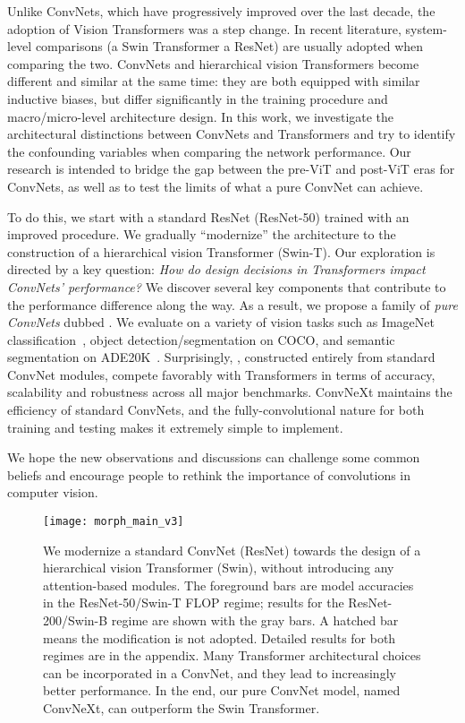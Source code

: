 Unlike ConvNets, which have progressively improved over the last decade, the adoption of Vision Transformers was a step change. In recent literature, system-level comparisons (\eg a Swin Transformer \vs a ResNet) are usually adopted when comparing the two. ConvNets and hierarchical vision Transformers become different and similar at the same time: they are both equipped with similar inductive biases, but differ significantly in the training procedure and macro/micro-level architecture design. 
In this work, 
we investigate the architectural distinctions between ConvNets and Transformers and try to identify the confounding variables when comparing the network performance.
Our research is intended to bridge the gap between the pre-ViT and post-ViT eras for ConvNets, as well as to test the limits of what a pure ConvNet can achieve. 

To do this, we start with a standard ResNet (\eg ResNet-50) trained with an improved procedure. We gradually ``modernize'' the architecture to the construction of a hierarchical vision Transformer (\eg Swin-T). Our exploration is directed by a key question: \emph{How do design decisions in Transformers impact ConvNets' performance?} We discover several key components that contribute to the performance difference along the way. As a result, we propose a family of \textit{pure ConvNets} dubbed \cnn{}. 
We evaluate  on a variety of vision tasks such as ImageNet classification~\cite{Deng2009}, object detection/segmentation on COCO\cite{Lin2014}, and semantic segmentation on ADE20K~\cite{Zhou2019}. Surprisingly, , constructed entirely from standard ConvNet modules, compete favorably with Transformers in terms of accuracy, scalability and robustness across all major benchmarks. 
ConvNeXt maintains the efficiency of standard ConvNets, and the fully-convolutional nature for both training and testing makes it extremely simple to implement.

We hope the new observations and discussions can challenge some common beliefs and encourage people to rethink the importance of convolutions in computer vision.

\begin{figure}[!htbp] 
\centering
\texttt{[image: morph\_main\_v3]}
\caption{We modernize a standard ConvNet (ResNet) towards the design of a hierarchical vision Transformer (Swin), without introducing any attention-based modules. The foreground bars are model accuracies in the ResNet-50/Swin-T FLOP regime; results for the ResNet-200/Swin-B regime are shown with the gray bars. A hatched bar means the modification is not adopted. Detailed results for both regimes are in the appendix. Many Transformer architectural choices can be incorporated in a ConvNet, and they lead to increasingly better performance. In the end, our pure ConvNet model, named ConvNeXt, can outperform the Swin Transformer.}
\label{fig:morph_main}
\end{figure}

